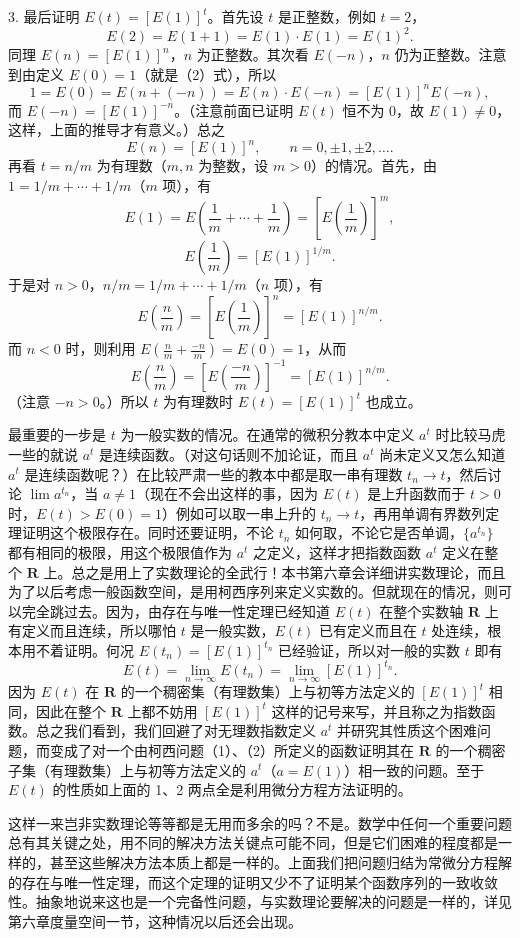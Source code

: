 3. 最后证明 $E(t)=[E(1)]^t$。首先设 $t$ 是正整数，例如 $t=2$，
\[
E(2)=E(1+1)=E(1)\cdot E(1)=E(1)^2.
\]
同理 $E(n)=[E(1)]^n$，$n$ 为正整数。其次看 $E(-n)$，$n$ 仍为正整数。注意到由定义 $E(0)=1$（就是（2）式），所以
\[
1=E(0)=E(n+(-n))=E(n)\cdot E(-n)=[E(1)]^nE(-n),
\]
而 $E(-n)=[E(1)]^{-n}$。（注意前面已证明 $E(t)$ 恒不为 $0$，故 $E(1)\ne0$，这样，上面的推导才有意义。）总之
\[
E(n)=[E(1)]^n,\qquad n=0,\pm1,\pm2,\ldots.
\]
再看 $t=n/m$ 为有理数（$m,n$ 为整数，设 $m>0$）的情况。首先，由 $1=1/m+\cdots+1/m$（$m$ 项），有
\[
E(1)=E\left(\frac1m+\cdots+\frac1m\right)=\left[E\left(\frac1m\right)\right]^m,
\]
\[
E\left(\frac1m\right)=[E(1)]^{1/m}.
\]
于是对 $n>0$，$n/m=1/m+\cdots+1/m$（$n$ 项），有
\[
E\left(\frac nm\right)=\left[E\left(\frac1m\right)\right]^n=[E(1)]^{n/m}.
\]
而 $n<0$ 时，则利用 $E\left(\frac nm+\frac{-n}{m}\right)=E(0)=1$，从而
\[
E\left(\frac nm\right)=\left[E\left(\frac{-n}{m}\right)\right]^{-1}=[E(1)]^{n/m}.
\]
（注意 $-n>0$。）所以 $t$ 为有理数时 $E(t)=[E(1)]^t$ 也成立。

最重要的一步是 $t$ 为一般实数的情况。在通常的微积分教本中定义 $a^t$ 时比较马虎一些的就说 $a^t$ 是连续函数。（对这句话则不加论证，而且 $a^t$ 尚未定义又怎么知道 $a^t$ 是连续函数呢？）在比较严肃一些的教本中都是取一串有理数 $t_n\to t$，然后讨论 $\lim a^{t_n}$，当 $a\ne1$（现在不会出这样的事，因为 $E(t)$ 是上升函数而于 $t>0$ 时，$E(t)>E(0)=1$）例如可以取一串上升的 $t_n\to t$，再用单调有界数列定理证明这个极限存在。同时还要证明，不论 $t_n$ 如何取，不论它是否单调，$\{a^{t_n}\}$ 都有相同的极限，用这个极限值作为 $a^t$ 之定义，这样才把指数函数 $a^t$ 定义在整个 $\mathbf R$ 上。总之是用上了实数理论的全武行！本书第六章会详细讲实数理论，而且为了以后考虑一般函数空间，是用柯西序列来定义实数的。但就现在的情况，则可以完全跳过去。因为，由存在与唯一性定理已经知道 $E(t)$ 在整个实数轴 $\mathbf R$ 上有定义而且连续，所以哪怕 $t$ 是一般实数，$E(t)$ 已有定义而且在 $t$ 处连续，根本用不着证明。何况 $E(t_n)=[E(1)]^{t_n}$ 已经验证，所以对一般的实数 $t$ 即有
\[
E(t)=\lim_{n\to\infty}E(t_n)=\lim_{n\to\infty}[E(1)]^{t_n}.
\]
因为 $E(t)$ 在 $\mathbf R$ 的一个稠密集（有理数集）上与初等方法定义的 $[E(1)]^t$ 相同，因此在整个 $\mathbf R$ 上都不妨用 $[E(1)]^t$ 这样的记号来写，并且称之为指数函数。总之我们看到，我们回避了对无理数指数定义 $a^t$ 并研究其性质这个困难问题，而变成了对一个由柯西问题（1）、（2）所定义的函数证明其在 $\mathbf R$ 的一个稠密子集（有理数集）上与初等方法定义的 $a^t$（$a=E(1)$）相一致的问题。至于 $E(t)$ 的性质如上面的 1、2 两点全是利用微分方程方法证明的。

这样一来岂非实数理论等等都是无用而多余的吗？不是。数学中任何一个重要问题总有其关键之处，用不同的解决方法关键点可能不同，但是它们困难的程度都是一样的，甚至这些解决方法本质上都是一样的。上面我们把问题归结为常微分方程解的存在与唯一性定理，而这个定理的证明又少不了证明某个函数序列的一致收敛性。抽象地说来这也是一个完备性问题，与实数理论要解决的问题是一样的，详见第六章度量空间一节，这种情况以后还会出现。

